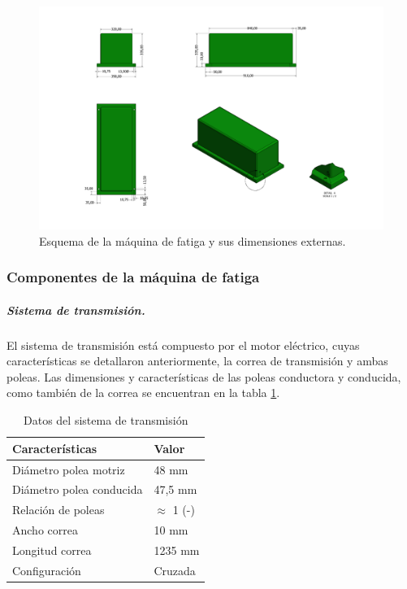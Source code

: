 \begin{figure}[h]
\centering
\includegraphics[width=1\linewidth, trim={10cm 37cm 17cm 2cm},clip]{Imagenes/MaqFatiga-1.pdf}
\caption{Esquema de la máquina de fatiga y sus dimensiones externas.}
\label{fig:diag_maqfat}
\end{figure}

\subsubsection{Componentes de la máquina de fatiga}
\subparagraph{Sistema de transmisión.}
El sistema de transmisión está compuesto por el motor eléctrico, cuyas características se detallaron anteriormente, la correa de transmisión y ambas poleas. Las dimensiones y características de las poleas conductora y conducida, como también de la correa se encuentran en la tabla \ref{tab:sist_transmision}. 

\begin{table}[h]
\centering
\begin{tabular}{@{}ll@{}}
\toprule
Características          & Valor   			\\ \midrule
Diámetro polea motriz    & 48 mm   			\\
Diámetro polea conducida & 47,5 mm 			\\
Relación de poleas		 & $\approx$ 1 (-) 	\\
Ancho correa             & 10 mm   			\\
Longitud correa          & 1235 mm 			\\
Configuración            & Cruzada 			\\ \bottomrule
\end{tabular}
\caption{Datos del sistema de transmisión}
\label{tab:sist_transmision}
\end{table}

